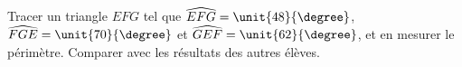 
\begin{exercice}\label{exosmath-0772}

    Tracer un triangle $EFG$ tel que $\widehat{EFG}=\unit{48}{\degree}$, \( \widehat{FGE}=\unit{70}{\degree}\) et \( \widehat{GEF}=\unit{62}{\degree}\), et en mesurer le périmètre. Comparer avec les résultats des autres élèves.

\end{exercice}
